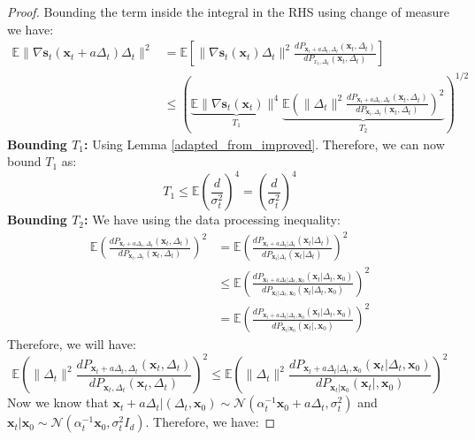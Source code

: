 \documentclass[11pt]{article}
\def\rvx{{\mathbf{x}}}
\def\vs{{\bm{s}}}
\begin{document}
\begin{proof}
    \noindent
    Bounding the term inside the integral in the RHS using change of measure we have:
    \begin{align*}
    \mathbb{E}\|\nabla \vs_t(\rvx_t+a\Delta_t)\Delta_t\|^2 &= \mathbb{E}\left[\|\nabla \vs_t(\rvx_t)\Delta_t\|^2 \frac{d P_{\rvx_t+a\Delta_t,\Delta_t}(\rvx_t,\Delta_t)}{d P_{x_t,\Delta_t}(\rvx_t,\Delta_t)} \right] \\
    &\leq \left( \underbrace{\mathbb{E}\|\nabla \vs_t(\rvx_t)\|^4}_{T_1} \underbrace{\mathbb{E}\left( \|\Delta_t\|^2\frac{d P_{\rvx_t+a\Delta_t,\Delta_t}(\rvx_t,\Delta_t)}{d P_{\rvx_t,\Delta_t}(\rvx_t,\Delta_t)} \right)^2}_{T_2}  \right)^{1/2}
    \end{align*}
\textbf{Bounding $T_1$:} Using Lemma \ref{adapted_from_improved}. Therefore, we can now bound $T_1$ as:
\[
T_1 \leq \mathbb{E}\left(\frac{d}{\sigma_t^2}\right)^4  = \left(\frac{d}{\sigma_t^2}\right)^4
\]
\textbf{Bounding $T_2$:} We have using the data processing inequality:
\begin{align*}
    \mathbb{E}\left( \frac{d P_{\rvx_t+a\Delta_t,\Delta_t}(\rvx_t,\Delta_t)}{d P_{\rvx_t,\Delta_t}(\rvx_t,\Delta_t)} \right)^2 &= \mathbb{E}\left( \frac{d P_{\rvx_t+a\Delta_t|\Delta_t}(\rvx_t|\Delta_t)}{d P_{\rvx_t|\Delta_t}(\rvx_t|\Delta_t)} \right)^2 \\
    &\leq  \mathbb{E}\left( \frac{d P_{\rvx_t+a\Delta_t|\Delta_t,\rvx_0}(\rvx_t|\Delta_t,\rvx_0)}{d P_{\rvx_t|\Delta_t,\rvx_0}(\rvx_t|\Delta_t,\rvx_0)} \right)^2 \\
    &= \mathbb{E}\left( \frac{d P_{\rvx_t+a\Delta_t|\Delta_t,\rvx_0}(\rvx_t|\Delta_t,\rvx_0)}{d P_{\rvx_t|\rvx_0}(\rvx_t|,\rvx_0)} \right)^2
\end{align*}
Therefore, we will have:
\[
\mathbb{E}\left( \|\Delta_t\|^2 \frac{d P_{\rvx_t+a\Delta_t,\Delta_t}(\rvx_t,\Delta_t)}{d P_{\rvx_t,\Delta_t}(\rvx_t,\Delta_t)} \right)^2 \leq \mathbb{E}\left( \|\Delta_t\|^2 \frac{d P_{\rvx_t+a\Delta_t|\Delta_t,\rvx_0}(\rvx_t|\Delta_t,\rvx_0)}{d P_{\rvx_t|\rvx_0}(\rvx_t|,\rvx_0)} \right)^2
\]
Now we know that $\rvx_t+a\Delta_t|(\Delta_t,\rvx_0)\sim \mathcal{N}(\alpha_t^{-1}\rvx_0+a\Delta_t,\sigma_t^2)$ and $\rvx_t|\rvx_0\sim \mathcal{N}(\alpha_t^{-1}\rvx_0,\sigma_t^2I_d)$. Therefore, we have:

\end{proof}
\end{document}
